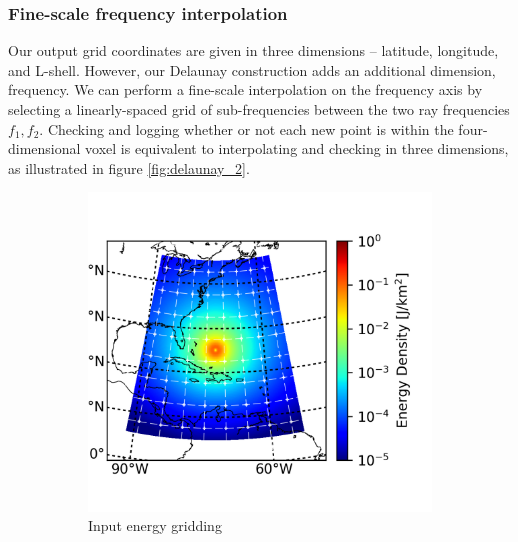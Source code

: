 \subsubsection{Fine-scale frequency interpolation}
Our output grid coordinates are given in three dimensions -- latitude, longitude, and L-shell. However, our Delaunay construction adds an additional dimension, frequency. We can perform a fine-scale interpolation on the frequency axis by selecting a linearly-spaced grid of sub-frequencies between the two ray frequencies $f_1, f_2$. Checking and logging whether or not each new point is within the four-dimensional voxel is equivalent to interpolating and checking in three dimensions, as illustrated in figure \ref{fig:delaunay_2}.

    \begin{figure}
    \centering
    \begin{subfigure}[t]{0.45\textwidth}
    \centering
        	\includegraphics{figures/input_energy_with_grid.png}
	\caption{Input energy gridding}
        \label{fig:input_energy_grid}
    \end{subfigure}\hfill
    \begin{subfigure}[t]{0.45\textwidth}
    \centering

\end{subfigure}
\end{figure}
